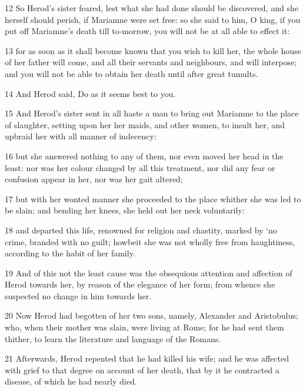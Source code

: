 \par 12 So Herod’s sister feared, lest what she had done should be discovered, and she herself should perish, if Mariamne were set free: so she said to him, O king, if you put off Mariamne’s death till to-morrow, you will not be at all able to effect it: 

\par 13 for as soon as it shall become known that you wish to kill her, the whole house of her father will come, and all their servants and neighbours, and will interpose; and you will not be able to obtain her death until after great tumults. 

\par 14 And Herod said, Do as it seems best to you. 

\par 15 And Herod’s sister sent in all haste a man to bring out Mariamne to the place of slaughter, setting upon her her maids, and other women, to insult her, and upbraid her with all manner of indecency: 

\par 16 but she answered nothing to any of them, nor even moved her head in the least: nor was her colour changed by all this treatment, nor did any fear or confusion appear in her, nor was her gait altered; 

\par 17 but with her wonted manner she proceeded to the place whither she was led to be slain; and bending her knees, she held out her neck voluntarily: 

\par 18 and departed this life, renowned for religion and chastity, marked by ‘no crime, branded with no guilt; howbeit she was not wholly free from haughtiness, according to the habit of her family. 

\par 19 And of this not the least cause was the obsequious attention and affection of Herod towards her, by reason of the elegance of her form; from whence she suspected no change in him towards her. 

\par 20 Now Herod had begotten of her two sons, namely, Alexander and Aristobulus; who, when their mother was slain, were living at Rome; for he had sent them thither, to learn the literature and language of the Romans. 

\par 21 Afterwards, Herod repented that he had killed his wife; and he was affected with grief to that degree on account of her death, that by it he contracted a disease, of which he had nearly died. 

